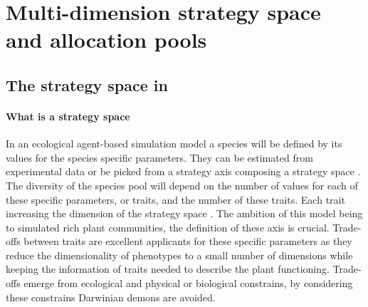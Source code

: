 \section{Multi-dimension strategy space and allocation pools}
%

\subsection{The strategy space in \model}

\paragraph{What is a strategy space}
In an ecological agent-based simulation model a species will be defined by its values for the species specific parameters. They can be estimated from experimental data \cite{taubert_modelling_2014, maire_traits_2009,lohier_explaining_2014} or be picked from a strategy axis \cite{reineking_environmental_2006, kleidon_global_2000} composing a strategy space \cite{westoby_leaf-height-seed_1998}. The diversity of the species pool will depend on the number of values for each of these specific parameters, or traits, and the number of these traits. Each trait increasing the dimension of the strategy space \cite{laughlin_intrinsic_2014}. The ambition of this model being to simulated rich plant communities, the definition of these axis is crucial. Trade-offs between traits are excellent applicants for these specific parameters as they reduce the dimensionality of phenotypes to a small number of dimensions \cite{wright_worldwide_2004, diaz_global_2016, reich_world-wide_2014} while keeping the information of traits needed to describe the plant functioning. Trade-offs emerge from ecological and physical or biological constrains, by considering these constrains Darwinian demons are avoided.\\

